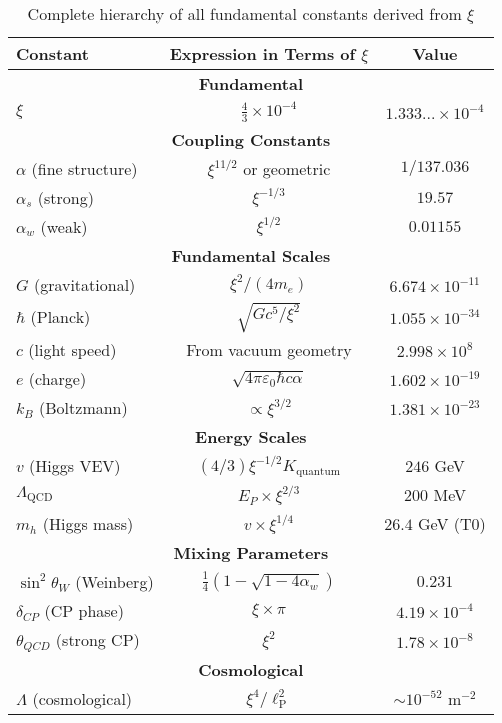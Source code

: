 \documentclass[12pt,a4paper]{article}
\newcommand{\lP}{\ell_{\text{P}}}
\newcommand{\xipar}{\xi}  %
\begin{document}
	\begin{table}[h]
		\centering
		\small
		\begin{tabular}{lcc}
			\toprule
			\textbf{Constant} & \textbf{Expression in Terms of $\xipar$} & \textbf{Value} \\
			\midrule
			\multicolumn{3}{c}{\textbf{Fundamental}} \\
			$\xipar$ & $\frac{4}{3} \times 10^{-4}$ & $1.333... \times 10^{-4}$ \\
			\midrule
			\multicolumn{3}{c}{\textbf{Coupling Constants}} \\
			$\alpha$ (fine structure) & $\xipar^{11/2}$ or geometric & $1/137.036$ \\
			$\alpha_s$ (strong) & $\xipar^{-1/3}$ & $19.57$ \\
			$\alpha_w$ (weak) & $\xipar^{1/2}$ & $0.01155$ \\
			\midrule
			\multicolumn{3}{c}{\textbf{Fundamental Scales}} \\
			$G$ (gravitational) & $\xipar^2/(4m_e)$ & $6.674 \times 10^{-11}$ \\
			$\hbar$ (Planck) & $\sqrt{Gc^5/\xipar^2}$ & $1.055 \times 10^{-34}$ \\
			$c$ (light speed) & From vacuum geometry & $2.998 \times 10^8$ \\
			$e$ (charge) & $\sqrt{4\pi\varepsilon_0\hbar c\alpha}$ & $1.602 \times 10^{-19}$ \\
			$k_B$ (Boltzmann) & $\propto \xipar^{3/2}$ & $1.381 \times 10^{-23}$ \\
			\midrule
			\multicolumn{3}{c}{\textbf{Energy Scales}} \\
			$v$ (Higgs VEV) & $(4/3)\xipar^{-1/2}K_{\text{quantum}}$ & $246$ GeV \\
			$\Lambda_{\text{QCD}}$ & $E_P \times \xipar^{2/3}$ & $200$ MeV \\
			$m_h$ (Higgs mass) & $v \times \xipar^{1/4}$ & $26.4$ GeV (T0) \\
			\midrule
			\multicolumn{3}{c}{\textbf{Mixing Parameters}} \\
			$\sin^2\theta_W$ (Weinberg) & $\frac{1}{4}(1-\sqrt{1-4\alpha_w})$ & $0.231$ \\
			$\delta_{CP}$ (CP phase) & $\xipar \times \pi$ & $4.19 \times 10^{-4}$ \\
			$\theta_{QCD}$ (strong CP) & $\xipar^2$ & $1.78 \times 10^{-8}$ \\
			\midrule
			\multicolumn{3}{c}{\textbf{Cosmological}} \\
			$\Lambda$ (cosmological) & $\xipar^4/\lP^2$ & $\sim 10^{-52}$ m$^{-2}$ \\
			\bottomrule
		\end{tabular}
		\caption{Complete hierarchy of all fundamental constants derived from $\xipar$}
	\end{table}
	
\end{document}
